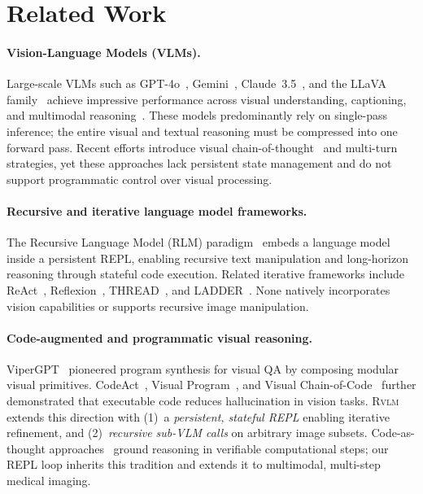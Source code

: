 \documentclass{article}
\newcommand{\RVLM}{\textsc{Rvlm}}
\begin{document}
	\section{Related Work}
	\label{sec:related}
	
	\paragraph{Vision-Language Models (VLMs).}
	Large-scale VLMs such as GPT-4o~\citep{openai2024gpt4o}, 
	Gemini~\citep{team2024gemini}, Claude~3.5~\citep{anthropic2024claude35},
	and the LLaVA family~\citep{liu2023llava,liu2024llavaone} achieve impressive
	performance across visual understanding, captioning, and multimodal reasoning~\cite{mayumu2025omniv2x}.
	These models predominantly rely on single-pass inference; the entire visual
	and textual reasoning must be compressed into one forward pass.
	Recent efforts introduce visual chain-of-thought~\citep{zhang2024cocot,wang2024visualcot}
	and multi-turn strategies, yet these approaches lack persistent state
	management and do not support programmatic control over visual processing.
	
	\paragraph{Recursive and iterative language model frameworks.}
	The Recursive Language Model (RLM) paradigm~\citep{zhang2025rlm} embeds a
	language model inside a persistent REPL, enabling recursive text manipulation
	and long-horizon reasoning through stateful code execution.
	Related iterative frameworks include ReAct~\citep{yao2023reactsynergizingreasoningacting},
	Reflexion~\citep{shinn2023reflexion}, THREAD~\citep{schroeder2025threadthinkingdeeperrecursive},
	and LADDER~\citep{simonds2025ladderselfimprovingllmsrecursive}.
	None natively incorporates vision capabilities or supports recursive image
	manipulation.
	
	\paragraph{Code-augmented and programmatic visual reasoning.}
	ViperGPT~\citep{surismenon2023vipergpt} pioneered program synthesis for
	visual QA by composing modular visual primitives.
	CodeAct~\citep{wang2024executablecodeactionselicit}, Visual
	Program~\citep{hu2024visualprogram}, and Visual
	Chain-of-Code~\citep{chen2025vcoc} further demonstrated that executable
	code reduces hallucination in vision tasks.
	\RVLM{} extends this direction with (1)~a \emph{persistent, stateful REPL}
	enabling iterative refinement, and (2)~\emph{recursive sub-VLM calls} on
	arbitrary image subsets.
	Code-as-thought approaches~\citep{chen2022program,gao2023pal} ground
	reasoning in verifiable computational steps; our REPL loop inherits this
	tradition and extends it to multimodal, multi-step medical imaging.
	
\end{document}
